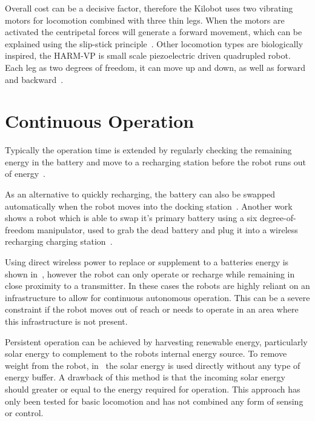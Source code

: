 Overall cost can be a decisive factor, therefore the Kilobot uses two vibrating motors for locomotion combined with three thin legs.
When the motors are activated the centripetal forces will generate a forward movement, which can be explained using the slip-stick principle~\cite{rubenstein_icra_2012}.
Other locomotion types are biologically inspired, the HARM-VP is small scale piezoelectric driven quadrupled robot.
Each leg as two degrees of freedom, it can move up and down, as well as forward and backward~\cite{baisch_iros_2013}.

\section{Continuous Operation}
\label{sec:continous_operation}

Typically the operation time is extended by regularly checking the remaining energy in the battery and move to a recharging station before the robot runs out of energy~\cite{pickem_icra_2015, rubenstein_icra_2012}.

As an alternative to quickly recharging, the battery can also be swapped automatically when the robot moves into the docking station~\cite{kemal_mech_2015}.
Another work shows a robot which is able to swap it's primary battery using a six degree-of-freedom manipulator, used to grab the dead battery and plug it into a wireless recharging charging station~\cite{zhang_conel_2013}.

Using direct wireless power to replace or supplement to a batteries energy is shown in~\cite{karpelson_icra_2014}, however the robot can only operate or recharge while remaining in close proximity to a transmitter. 
In these cases the robots are highly reliant on an infrastructure to allow for continuous autonomous operation.
This can be a severe constraint if the robot moves out of reach or needs to operate in an area where this infrastructure is not present.
 
Persistent operation can be achieved by harvesting renewable energy, particularly solar energy to complement to the robots internal energy source. 
To remove weight from the robot, in~\cite{bruhwiler_iros_2015} the solar energy is used directly without any type of energy buffer. 
A drawback of this method is that the incoming solar energy should greater or equal to the energy required for operation. 
This approach has only been tested for basic locomotion and has not combined any form of sensing or control.

